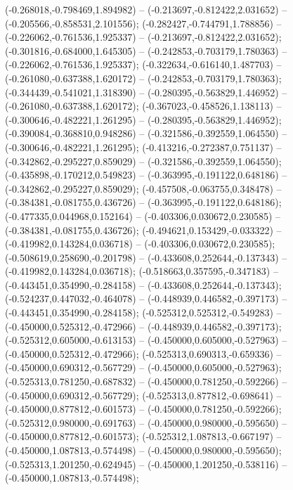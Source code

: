  (-0.268018,-0.798469,1.894982) -- (-0.213697,-0.812422,2.031652) -- (-0.205566,-0.858531,2.101556);
 (-0.282427,-0.744791,1.788856) -- (-0.226062,-0.761536,1.925337) -- (-0.213697,-0.812422,2.031652);
 (-0.301816,-0.684000,1.645305) -- (-0.242853,-0.703179,1.780363) -- (-0.226062,-0.761536,1.925337);
 (-0.322634,-0.616140,1.487703) -- (-0.261080,-0.637388,1.620172) -- (-0.242853,-0.703179,1.780363);
 (-0.344439,-0.541021,1.318390) -- (-0.280395,-0.563829,1.446952) -- (-0.261080,-0.637388,1.620172);
 (-0.367023,-0.458526,1.138113) -- (-0.300646,-0.482221,1.261295) -- (-0.280395,-0.563829,1.446952);
 (-0.390084,-0.368810,0.948286) -- (-0.321586,-0.392559,1.064550) -- (-0.300646,-0.482221,1.261295);
 (-0.413216,-0.272387,0.751137) -- (-0.342862,-0.295227,0.859029) -- (-0.321586,-0.392559,1.064550);
 (-0.435898,-0.170212,0.549823) -- (-0.363995,-0.191122,0.648186) -- (-0.342862,-0.295227,0.859029);
 (-0.457508,-0.063755,0.348478) -- (-0.384381,-0.081755,0.436726) -- (-0.363995,-0.191122,0.648186);
 (-0.477335,0.044968,0.152164) -- (-0.403306,0.030672,0.230585) -- (-0.384381,-0.081755,0.436726);
 (-0.494621,0.153429,-0.033322) -- (-0.419982,0.143284,0.036718) -- (-0.403306,0.030672,0.230585);
 (-0.508619,0.258690,-0.201798) -- (-0.433608,0.252644,-0.137343) -- (-0.419982,0.143284,0.036718);
 (-0.518663,0.357595,-0.347183) -- (-0.443451,0.354990,-0.284158) -- (-0.433608,0.252644,-0.137343);
 (-0.524237,0.447032,-0.464078) -- (-0.448939,0.446582,-0.397173) -- (-0.443451,0.354990,-0.284158);
 (-0.525312,0.525312,-0.549283) -- (-0.450000,0.525312,-0.472966) -- (-0.448939,0.446582,-0.397173);
 (-0.525312,0.605000,-0.613153) -- (-0.450000,0.605000,-0.527963) -- (-0.450000,0.525312,-0.472966);
 (-0.525313,0.690313,-0.659336) -- (-0.450000,0.690312,-0.567729) -- (-0.450000,0.605000,-0.527963);
 (-0.525313,0.781250,-0.687832) -- (-0.450000,0.781250,-0.592266) -- (-0.450000,0.690312,-0.567729);
 (-0.525313,0.877812,-0.698641) -- (-0.450000,0.877812,-0.601573) -- (-0.450000,0.781250,-0.592266);
 (-0.525312,0.980000,-0.691763) -- (-0.450000,0.980000,-0.595650) -- (-0.450000,0.877812,-0.601573);
 (-0.525312,1.087813,-0.667197) -- (-0.450000,1.087813,-0.574498) -- (-0.450000,0.980000,-0.595650);
 (-0.525313,1.201250,-0.624945) -- (-0.450000,1.201250,-0.538116) -- (-0.450000,1.087813,-0.574498);
